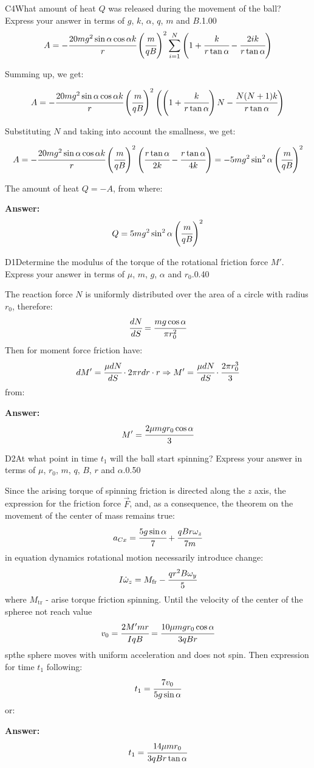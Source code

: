\documentclass[11pt,a4paper]{article}
\begin{document}
\begin{solcard}{C4}{What amount of heat $Q$ was released during the movement of the ball? Express your answer in terms of $g$, $k$, $\alpha$, $q$, $m$ and $B$.}{1.00}
$$A=-\cfrac{20mg^2\sin\alpha\cos\alpha k}{r}\left(\cfrac{m}{qB}\right)^2\sum\limits_{i=1}^N \left(1+\cfrac{k}{r\tan\alpha}-\cfrac{2ik}{r\tan\alpha}\right)$$


Summing up, we get:


$$A=-\cfrac{20mg^2\sin\alpha\cos\alpha k}{r}\left(\cfrac{m}{qB}\right)^2\left(\left(1+\cfrac{k}{r\tan\alpha}\right)N-\cfrac{N(N+1)k}{r\tan\alpha}\right)$$


Substituting $N$ and taking into account the smallness, we get:


$$A=-\cfrac{20mg^2\sin\alpha\cos\alpha k}{r}\left(\cfrac{m}{qB}\right)^2\left(\cfrac{r\tan\alpha}{2k}-\cfrac{r\tan\alpha}{4k}\right)=-5mg^2\sin^2\alpha\left(\cfrac{m}{qB}\right)^2 $$


The amount of heat $Q=-A$, from where:

\par\smallskip\noindent\textbf{Answer:} $$Q=5mg^2\sin^2\alpha\left(\cfrac{m}{qB}\right)^2 $$
\end{solcard}

\begin{solcard}{D1}{Determine the modulus of the torque of the rotational friction force $M'$. Express your answer in terms of $\mu$, $m$, $g$, $\alpha$ and $r_0$.}{0.40}

The reaction force $N$ is uniformly distributed over the area of a circle with radius $r_0$, therefore: $$\cfrac{dN}{dS}=\cfrac{mg\cos\alpha}{\pi{r}^2_0} $$Then for moment force friction have: $$dM'=\cfrac{\mu dN}{dS}\cdot{2\pi{r}dr}\cdot{r}\Rightarrow{M'=\cfrac{\mu dN}{dS}\cdot{\cfrac{2\pi{r}^3_0}{3}}} $$from:

\par\smallskip\noindent\textbf{Answer:} $$M'=\cfrac{2\mu mgr_0\cos\alpha}{3} $$
\end{solcard}

\begin{solcard}{D2}{At what point in time $t_1$ will the ball start spinning? Express your answer in terms of $\mu$, $r_0$, $m$, $q$, $B$, $r$ and $\alpha$.}{0.50}

Since the arising torque of spinning friction is directed along the $z$ axis, the expression for the friction force $\vec{F}$, and, as a consequence, the theorem on the movement of the center of mass remains true: $$a_{Cx}=\cfrac{5g\sin\alpha}{7}+\cfrac{qBr\omega_z}{7m} $$in equation dynamics rotational motion necessarily introduce change: $$I\dot{\omega}_z=M_\text{fr}-\cfrac{qr^2B\omega_y}{5} $$where $M_\text{tr}$ - arise torque friction spinning. Until the velocity of the center of the spheree not reach value $$v_0=\cfrac{2M'mr}{IqB}=\cfrac{10\mu mgr_0\cos\alpha}{3qBr} $$spthe sphere moves with uniform acceleration and does not spin. Then expression for time $t_1$ following: $$t_1=\cfrac{7v_0}{5g\sin\alpha} $$or:

\par\smallskip\noindent\textbf{Answer:} $$t_1=\cfrac{14\mu mr_0}{3qBr\tan\alpha} $$
\end{solcard}
\end{document}
